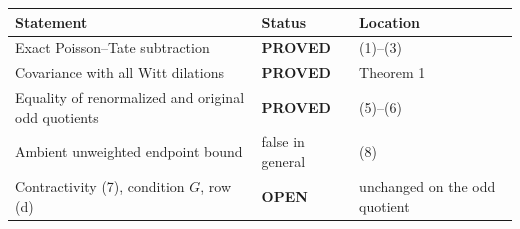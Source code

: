\documentclass[11pt]{article}
\newcommand{\PROVED}{\textcolor{green!40!black}{\textbf{PROVED}}}
\newcommand{\OPEN}{\textcolor{red!70!black}{\textbf{OPEN}}}
\begin{document}
\begin{center}
\begin{tabular}{>{\raggedright\arraybackslash}p{.58\linewidth}
                >{\centering\arraybackslash}p{.15\linewidth}
                >{\raggedright\arraybackslash}p{.17\linewidth}}
\toprule
Statement & Status & Location \\
\midrule
Exact Poisson--Tate subtraction & \PROVED & (1)--(3) \\
Covariance with all Witt dilations & \PROVED & Theorem 1 \\
Equality of renormalized and original odd quotients & \PROVED & (5)--(6) \\
Ambient unweighted endpoint bound & false in general & (8) \\
Contractivity (7), condition $G$, row (d) & \OPEN & unchanged on the odd quotient \\
\bottomrule
\end{tabular}
\end{center}
\end{document}
